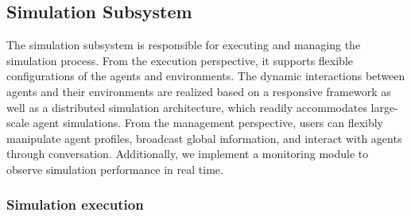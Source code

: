 \documentclass{article}
\theoremstyle{definition}
\theoremstyle{theorem}
\theoremstyle{proof}
\theoremstyle{remark}
\begin{document}
    




    \subsection{Simulation Subsystem}
    The simulation subsystem is responsible for executing and managing the simulation process.
    From the execution perspective, it supports flexible configurations of the agents and environments. The dynamic interactions between agents and their environments are realized based on a responsive framework as well as a distributed simulation architecture, which readily accommodates large-scale agent simulations.
    From the management perspective, users can flexibly manipulate agent profiles, broadcast global information, and interact with agents through conversation. Additionally, we implement a monitoring module to observe simulation performance in real time.

    \subsubsection{Simulation execution}
    
\end{document}
